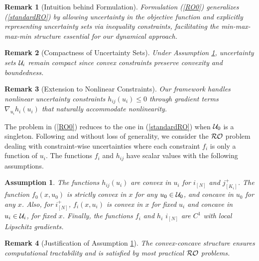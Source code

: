 \documentclass[journal,twoside,web]{ieeecolor}
\newcommand{\rev}[1]{\textcolor{revisionblue}{#1}}
\newtheorem{assumption}[theorem]{Assumption}
\newtheorem{remark}{Remark}
\begin{document}
\begin{remark}[\rev{Intuition behind Formulation}]\rev{Formulation (\ref{RO0}) generalizes (\ref{standardRO}) by allowing uncertainty in the objective function and explicitly representing uncertainty sets via inequality constraints, facilitating the min-max-max-min structure essential for our dynamical approach.}
\end{remark}

\begin{remark}[\rev{Compactness of Uncertainty Sets}]
\rev{Under Assumption \ref{assume1}, uncertainty sets ${\cal U}_i$ remain compact since convex constraints preserve convexity and boundedness.}
\end{remark}

\begin{remark}[\rev{Extension to Nonlinear Constraints}]
\rev{Our framework handles nonlinear uncertainty constraints $h_{ij}(u_i) \leq 0$ through gradient terms $\nabla_{u_i} h_i(u_i)$ that naturally accommodate nonlinearity.}
\end{remark}

The problem in (\ref{RO0}) reduces to the one in (\ref{standardRO}) when ${\cal U}_0$ is a singleton.
Following \cite{bental2009-2} and without loss of generality, we consider the ${\cal RO}$ problem dealing with constraint-wise uncertainties where each constraint $f_i$ is only a function of $u_i$.
The functions $f_i$ and $h_{ij}$ have scalar values with the following assumptions.

\begin{assumption}\label{assume1} The functions $h_{ij}(u_i)$ are convex in $u_i$ for $i_{[N]}$ and $j^+_{[K_i]}$.
The function $f_0(x,u_0)$ is strictly convex in $x$ for any $u_0\in {\cal U}_0$, and concave in $u_0$ for any $x$. Also, for $i^+_{[N]}$, $f_i(x,u_i)$ is convex in $x$ for fixed $u_i$ and concave in $u_i\in {\cal U}_i$, for fixed $x$.
Finally, the functions $f_i$ and $h_i$ $i_{[N]}$ are $C^1$ with local Lipschitz gradients.
\end{assumption}

\begin{remark}[\rev{Justification of Assumption \ref{assume1}}]
\rev{The convex-concave structure ensures computational tractability and is satisfied by most practical ${\cal RO}$ problems.}
\end{remark}
\end{document}
